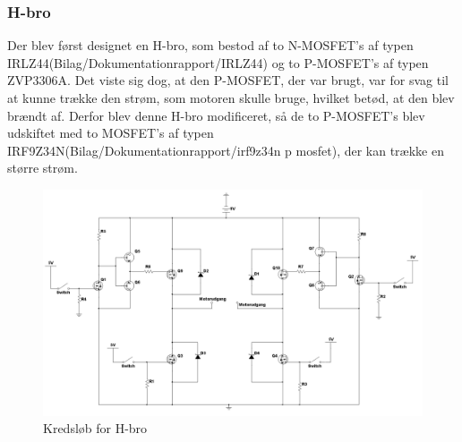 \subsubsection{H-bro}
Der blev først designet en H-bro, som bestod af to N-MOSFET's af typen IRLZ44(Bilag/Dokumentationrapport/IRLZ44) og to P-MOSFET's af typen ZVP3306A. Det viste sig dog, at den P-MOSFET, der var brugt, var for svag til at kunne trække den strøm, som motoren skulle bruge, hvilket betød, at den blev brændt af. Derfor blev denne H-bro modificeret, så de to P-MOSFET's blev udskiftet med to MOSFET's af typen IRF9Z34N(Bilag/Dokumentationrapport/irf9z34n p mosfet), der kan trække en større strøm. 

\begin{figure}[H]
	\centering
	\includegraphics[width=\textwidth]{DesignOgImplementering/images/H-bro}
	\caption{Kredsløb for H-bro}
	\label{fig:hbro}
	\end{figure}

